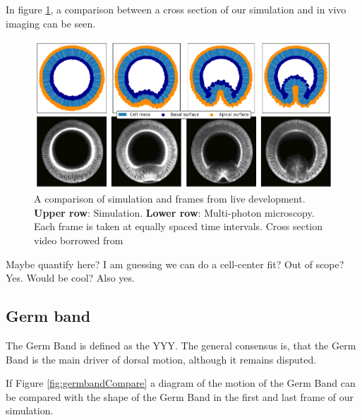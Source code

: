 In figure \ref{fig:VFComparison}, a comparison between a cross section of our simulation and in vivo imaging can be seen.

\begin{figure}[H]
    \centering
    \includegraphics[width=1\linewidth]{chapters/Results/figures/VF_comparison.png}
    \caption{A comparison of simulation and frames from live development. \textbf{Upper row}: Simulation. \textbf{Lower row}: Multi-photon microscopy. \\Each frame is taken at equally spaced time intervals. Cross section video borrowed from \cite{conte2012biomechanical}}
    \label{fig:VFComparison}
\end{figure}


Maybe quantify here?
I am guessing we can do a cell-center fit?
Out of scope? Yes. Would be cool? Also yes.
\subsection{Germ band}
The Germ Band is defined as the YYY. The general consensus is, that the Germ Band is the main driver of dorsal motion, although it remains disputed.

If Figure \ref{fig:germbandCompare} a diagram of the motion of the Germ Band can be compared with the shape of the Germ Band in the first and last frame of our simulation. 


